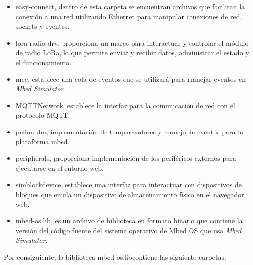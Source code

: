 \begin{itemize}
	\item easy-connect, dentro de esta carpeta se encuentran archivos que facilitan la conexión a una red utilizando Ethernet para manipular conexiones de red, sockets y eventos.
	
	\item lora-radio-drv, proporciona un marco para interactuar y controlar el módulo de radio LoRa, lo que permite enviar y recibir datos, administrar el estado y el funcionamiento.

	\item mcc, establece una cola de eventos que se utilizará para manejar eventos en \textit{Mbed Simulator}. 
	
	\item MQTTNetwork, establece la interfaz para la comunicación de red con el protocolo MQTT. 
	
	\item pelion-dm, implementación de temporizadores y manejo de eventos para la plataforma mbed.
	
	\item peripherals, proporciona implementación de los periféricos externos para ejecutarse en el entorno web.
	
	\item simblockdevice, establece una interfaz para interactuar con  dispositivos de bloques que emula un dispositivo de almacenamiento físico en el navegador web.
	
	\item mbed-os.lib, es un archivo de biblioteca en formato binario que contiene la versión del código fuente del sistema operativo de Mbed OS  que usa \textit{Mbed Simulator}.
	
\end{itemize}


Por consiguiente, la biblioteca \textquotedbl mbed-os.lib\textquotedbl contiene las siguiente carpetas: 

